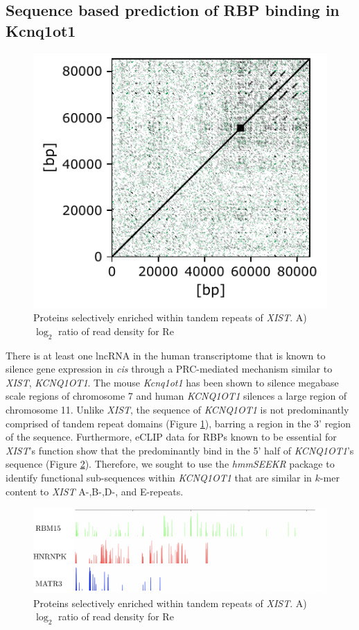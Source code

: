 \subsection{Sequence based prediction of RBP binding in Kcnq1ot1}

\begin{figure}[h!]
\centering
\includegraphics[width=.4\textwidth]{images/kcnd.pdf}
\caption{Proteins selectively enriched within tandem repeats of \emph{XIST}. A) $\log_2$ ratio of read density for Re}
\label{fig:kcndot}
\end{figure}

There is at least one lncRNA in the human transcriptome that is known to silence gene expression in \emph{cis} through a PRC-mediated mechanism similar to \emph{XIST}, \emph{KCNQ1OT1}. The mouse \emph{Kcnq1ot1} has been shown to silence megabase scale regions of chromosome 7 and human \emph{KCNQ1OT1} silences a large region of chromosome 11. Unlike \emph{XIST}, the sequence of \emph{KCNQ1OT1} is not predominantly comprised of tandem repeat domains (Figure \ref{fig:kcndot}), barring a region in the 3' region of the sequence. Furthermore, eCLIP data for RBPs known to be essential for \emph{XIST}'s function show that the predominantly bind in the 5' half of \emph{KCNQ1OT1}'s sequence (Figure \ref{fig:kcnproteins}). Therefore, we sought to use the \emph{hmmSEEKR} package to identify functional sub-sequences within \emph{KCNQ1OT1} that are similar in $k$-mer content to \emph{XIST} A-,B-,D-, and E-repeats. 


\begin{figure}[h!]
\centering
\includegraphics[width=\textwidth]{images/kcnproteins.pdf}
\caption{Proteins selectively enriched within tandem repeats of \emph{XIST}. A) $\log_2$ ratio of read density for Re}
\label{fig:kcnproteins}
\end{figure}

